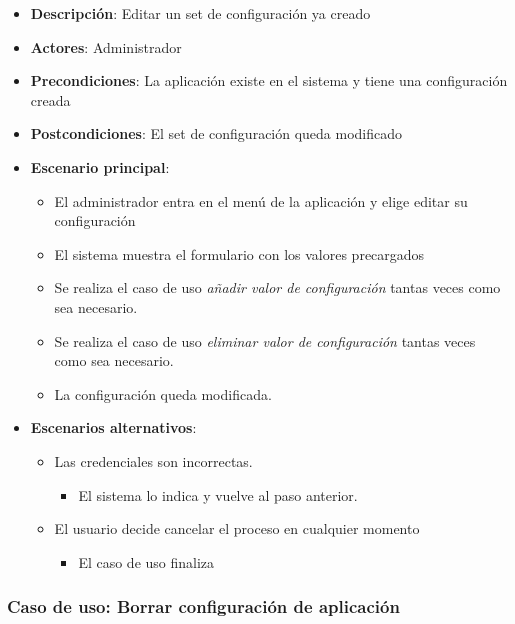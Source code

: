 \documentclass[12pt,a4paperpaper,]{report}
\providecommand{\tightlist}{%
  \setlength{\itemsep}{0pt}\setlength{\parskip}{0pt}}
\begin{document}
\begin{itemize}
\tightlist
\item
  \textbf{Descripción}: Editar un set de configuración ya creado
\item
  \textbf{Actores}: Administrador
\item
  \textbf{Precondiciones}: La aplicación existe en el sistema y tiene
  una configuración creada
\item
  \textbf{Postcondiciones}: El set de configuración queda modificado
\item
  \textbf{Escenario principal}:

  \begin{itemize}
  \tightlist
  \item
    El administrador entra en el menú de la aplicación y elige editar su
    configuración
  \item
    El sistema muestra el formulario con los valores precargados
  \item
    Se realiza el caso de uso \emph{añadir valor de configuración}
    tantas veces como sea necesario.
  \item
    Se realiza el caso de uso \emph{eliminar valor de configuración}
    tantas veces como sea necesario.
  \item
    La configuración queda modificada.
  \end{itemize}
\item
  \textbf{Escenarios alternativos}:

  \begin{itemize}
  \tightlist
  \item
    Las credenciales son incorrectas.

    \begin{itemize}
    \tightlist
    \item
      El sistema lo indica y vuelve al paso anterior.
    \end{itemize}
  \item
    El usuario decide cancelar el proceso en cualquier momento

    \begin{itemize}
    \tightlist
    \item
      El caso de uso finaliza
    \end{itemize}
  \end{itemize}
\end{itemize}

\subsubsection{Caso de uso: Borrar configuración de
aplicación}\label{caso-de-uso-borrar-configuraciuxf3n-de-aplicaciuxf3n}
\end{document}
